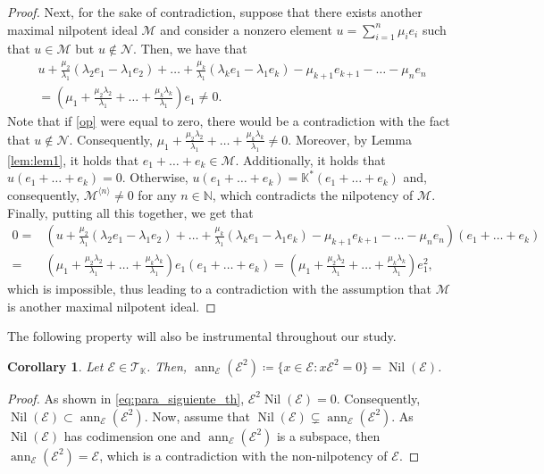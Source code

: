 \documentclass[12pt,reqno]{amsart}
\newtheorem{corollary}[theorem]{Corollary}
\theoremstyle{definition}
\theoremstyle{remark}
\DeclareMathOperator{\ann}{ann}
\DeclareMathOperator{\nil}{Nil}
\numberwithin{equation}{section}
\begin{document}
\begin{proof}
Next, for the sake of contradiction, suppose that there exists another maximal nilpotent ideal $\mathcal{M}$ and consider a nonzero element $u=\sum_{i=1}^n\mu_ie_i$ such that $u\in\mathcal{M}$ but $u\notin\mathcal{N}$. Then, we have that 
\begin{multline}\label{op}
	u+\frac{\mu_2}{\lambda_1}(\lambda_2e_1-\lambda_1e_2)+\dots+\frac{\mu_k}{\lambda_1}(\lambda_ke_1-\lambda_1e_k)-\mu_{k+1}e_{k+1}-\dots-\mu_ne_n\\=\left(\mu_1+\frac{\mu_2\lambda_2}{\lambda_1}+\dots+\frac{\mu_k\lambda_k}{\lambda_1}\right)e_1\neq0.
\end{multline}
Note that if \eqref{op} were equal to zero, there would be a contradiction with the fact that $u\notin\mathcal{N}$. Consequently, $\mu_1+\frac{\mu_2\lambda_2}{\lambda_1}+\dots+\frac{\mu_k\lambda_k}{\lambda_1}\neq0$. Moreover, by Lemma \ref{lem:lem1}, it holds that $e_1+\dots+e_k\in\mathcal{M}$. Additionally, it holds that $u(e_1+\dots+e_k)=0$. Otherwise, $u(e_1+\dots+e_k)=\mathbb{K}^*(e_1+\dots+e_k)$ and, consequently, $\mathcal{M}^{\langle n\rangle}\neq0$ for any $n\in\mathbb{N}$, which contradicts the nilpotency of $\mathcal{M}$. Finally, putting all this together, we get that 
\begin{align*}
	0=&\left(u+\frac{\mu_2}{\lambda_1}(\lambda_2e_1-\lambda_1e_2)+\dots+\frac{\mu_k}{\lambda_1}(\lambda_ke_1-\lambda_1e_k)-\mu_{k+1}e_{k+1}-\dots-\mu_ne_n\right)(e_1+\dots+e_k)\\=&\left(\mu_1+\frac{\mu_2\lambda_2}{\lambda_1}+\dots+\frac{\mu_k\lambda_k}{\lambda_1}\right)e_1(e_1+\dots+e_k)
	=\left(\mu_1+\frac{\mu_2\lambda_2}{\lambda_1}+\dots+\frac{\mu_k\lambda_k}{\lambda_1}\right)e_1^2,
\end{align*}
which is impossible, thus leading to a contradiction with the assumption that $\mathcal{M}$ is another maximal nilpotent ideal.
\end{proof}

The following property will also be instrumental throughout our study. 
\begin{corollary}\label{lem:annvsnilrad}
	Let $\mathcal{E}\in\mathcal{T}
	_{\mathbb{K}}$. Then, $\ann_{\mathcal{E}}(\mathcal{E}^2)\coloneqq\{x\in\mathcal{E}\colon x\mathcal{E}^2=0\}=\nil(\mathcal{E})$.
\end{corollary}
\begin{proof}
	As shown in \eqref{eq:para_siguiente_th}, $\mathcal{E}^2\nil(\mathcal{E})=0$. Consequently, $\nil(\mathcal{E})\subset\ann_{\mathcal{E}}(\mathcal{E}^2)$. Now, assume that $\nil(\mathcal{E})\varsubsetneq\ann_{\mathcal{E}}(\mathcal{E}^2)$. As $\nil(\mathcal{E})$ has codimension one and $\ann_{\mathcal{E}}(\mathcal{E}^2)$ is a subspace, then $\ann_{\mathcal{E}}(\mathcal{E}^2)=\mathcal{E}$, which is a contradiction with the non-nilpotency of $\mathcal{E}$.
\end{proof}
\end{document}

